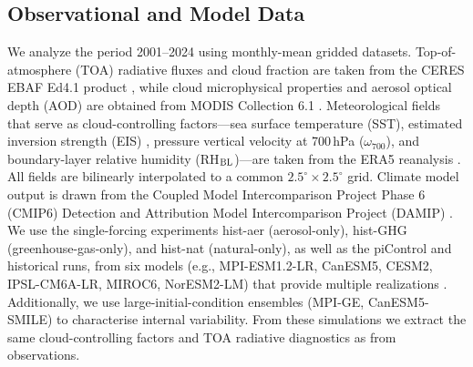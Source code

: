 \documentclass{article}
\begin{document}
\subsection{Observational and Model Data}
\label{sec:data}
We analyze the period 2001--2024 using monthly-mean gridded datasets. Top-of-atmosphere (TOA) radiative fluxes and cloud fraction are taken from the CERES EBAF Ed4.1 product \cite{loeb2021ceres}, while cloud microphysical properties and aerosol optical depth (AOD) are obtained from MODIS Collection 6.1 \cite{platnick2017modis}. Meteorological fields that serve as cloud-controlling factors—sea surface temperature (SST), estimated inversion strength (EIS) \cite{wood2012eis}, pressure vertical velocity at 700\,hPa ($\omega_{700}$), and boundary-layer relative humidity (RH$_{\rm BL}$)—are taken from the ERA5 reanalysis \cite{hershbach2020era5}. All fields are bilinearly interpolated to a common $2.5^\circ \times 2.5^\circ$ grid.
Climate model output is drawn from the Coupled Model Intercomparison Project Phase 6 (CMIP6) Detection and Attribution Model Intercomparison Project (DAMIP) \cite{gillett2016damip}. We use the single-forcing experiments hist-aer (aerosol-only), hist-GHG (greenhouse-gas-only), and hist-nat (natural-only), as well as the piControl and historical runs, from six models (e.g., MPI-ESM1.2-LR, CanESM5, CESM2, IPSL-CM6A-LR, MIROC6, NorESM2-LM) that provide multiple realizations \cite{eyring2016cmip6}. Additionally, we use large-initial-condition ensembles (MPI-GE, CanESM5-SMILE) to characterise internal variability. From these simulations we extract the same cloud-controlling factors and TOA radiative diagnostics as from observations.
\end{document}
